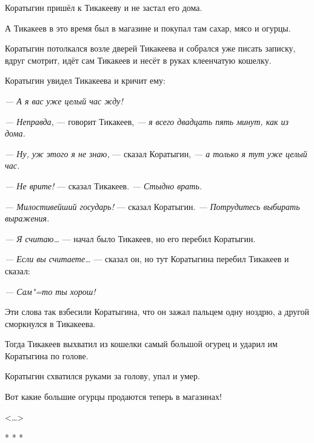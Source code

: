 Коратыгин пришёл к Тикакееву и не застал его дома.

А Тикакеев в это время был в магазине и покупал там сахар, мясо и огурцы.

Коратыгин потолкался возле дверей Тикакеева и собрался уже писать записку, вдруг смотрит, идёт сам Тикакеев и несёт в руках клеенчатую кошелку.

Коратыгин увидел Тикакеева и кричит ему:

\textit{--- А я вас уже целый час жду!}

\textit{--- Неправда,} --- говорит Тикакеев, \textit{--- я всего двадцать пять минут, как из дома.}

\textit{--- Ну, уж этого я не знаю,} --- сказал Коратыгин, \textit{--- а только я тут уже целый час.}

\textit{--- Не врите!} --- сказал Тикакеев. \textit{--- Стыдно врать.}

\textit{--- Милостивейший государь!} --- сказал Коратыгин. \textit{--- Потрудитесь выбирать выражения.}

\textit{--- Я считаю\dots} --- начал было Тикакеев, но его перебил Коратыгин.

\textit{--- Если вы считаете\dots} --- сказал он, но тут Коратыгина перебил Тикакеев и сказал:

\textit{--- Сам"=то ты хорош!}

Эти слова так взбесили Коратыгина, что он зажал пальцем одну ноздрю, а другой сморкнулся в Тикакеева.

Тогда Тикакеев выхватил из кошелки самый большой огурец и ударил им Коратыгина по голове.

Коратыгин схватился руками за голову, упал и умер.

Вот какие большие огурцы продаются теперь в магазинах!

\begin{flushright}
<\dots{}>
\end{flushright}

\begin{center}
* * * 
\end{center}
